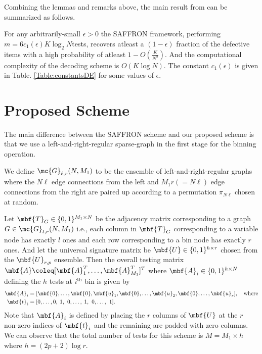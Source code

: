 \documentclass[conference,,twocolumn]{IEEEtran}
\begin{document}
Combining the lemmas and remarks above, the main result from \cite{lee2015saffron} can be summarized as follows.
\begin{theorem}
For any arbitrarily-small $\epsilon>0$ the SAFFRON framework, performing $m=6c_1(\epsilon)K \log_{2}N$tests, recovers atleast a $(1-\epsilon)$ fraction of the defective items with a high probability of atleast $1-O(\frac{K}{N^2})$. And the computational complexity of the decoding scheme is $O(K\log N)$. The constant $c_1(\epsilon)$ is given in Table. \ref{Table:constantsDE} for some values of $\epsilon$.
\end{theorem}

\section{Proposed Scheme}
The main difference between the SAFFRON scheme and our proposed scheme is that we use a left-and-right-regular sparse-graph in the first stage for the binning operation.

\begin{definition}
We define $\mc{G}_{\ell,r}(N,M_1)$ to be the ensemble of left-and-right-regular graphs where the $N\ell$ edge connections from the left and $M_1r(=N\ell)$ edge connections from the right are paired up according to a permutation $\pi_{N\ell}$ chosen at random. 
\end{definition}

 Let $\mbf{T}_{G}\in\{0,1\}^{M_1\times N }$ be the adjacency matrix corresponding to a graph $G\in\mc{G}_{l,r}(N,M_1)$ i.e., each column in $\mbf{T}_{G}$ corresponding to a variable node has exactly $l$ ones and each row corresponding to a bin node has exactly $r$ ones. And let the universal signature matrix be $\mbf{U}\in\{0,1\}^{h \times r}$ chosen from the $\mbf{U}_{r,p}$ ensemble. Then the overall testing matrix $\mbf{A}\coleq [\mbf{A}_{1}^{T},\ldots,\mbf{A}_{M_{1}}^{T}]^T$ where $\mbf{A}_{i}\in\{0,1\}^{h\times N}$ defining the $h$ tests at $i^{\text{th}}$ bin is given by
 \begin{align}
 \mbf{A}_i&=[\mbf{0},\ldots,\mbf{0},\mbf{u}_1, \mbf{0},\ldots, \mbf{u}_2,\mbf{0}, \ldots, \mbf{u}_{r}],\quad \text{where}\label{Eqn:TestingMatrixDefn}\\
\mbf{t}_i &= [0,\ldots,0,\hspace{0.6ex}1,\hspace{0.9ex} 0, \ldots,\hspace{0.6ex}1,\hspace{0.9ex}0, \ldots, \hspace{0.9ex}1].\nonumber
 \end{align}
Note that $\mbf{A}_i$ is defined by placing the $r$ columns of $\mbf{U}$ at the $r$ non-zero indices of $\mbf{t}_i$ and the remaining are padded with zero columns. We can observe that the total number of tests for this scheme is $M=M_1\times h$ where $h=(2p+2)\log r$.
\end{document}

